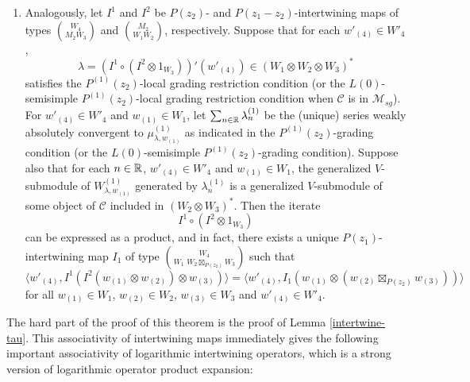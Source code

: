 \documentclass[12pt]{article}
\begin{document}
\begin{theo}
\begin{enumerate}
\item Analogously, let $I^1$ and $I^2$ be $P(z_2)$- and
$P(z_{1}-z_{2})$-intertwining maps of types ${W_4}\choose {M_2W_3}$ and
${M_2}\choose {W_1W_2}$, respectively. Suppose that for each
$w'_{(4)} \in W'_{4}$,
\[
\lambda=(I^1\circ (I^2 \otimes 1_{W_3}))'(w'_{(4)}) \in
(W_{1}\otimes W_{2} \otimes W_{3})^{*}
\]
satisfies the $P^{(1)}(z_2)$-local grading restriction condition (or
the $L(0)$-semisimple $P^{(1)}(z_2)$-local grading restriction
condition when $\mathcal{C}$ is in $\mathcal{M}_{sg}$). For
$w'_{(4)}\in W'_{4}$ and $w_{(1)}\in W_{1}$, let $\sum_{n\in
\mathbb{R}}\lambda_{n}^{(1)}$ be the (unique) series weakly absolutely
convergent to $\mu^{(1)}_{\lambda, w_{(1)}}$ as indicated in the
$P^{(1)}(z_2)$-grading condition (or the $L(0)$-semisimple
$P^{(1)}(z_2)$-grading condition).  Suppose also that for each
$n \in \mathbb{R}$, $w'_{(4)} \in W'_4$ and $w_{(1)} \in W_1$, the generalized
$V$-submodule of $W^{(1)}_{\lambda, w_{(1)}}$ generated by
$\lambda_{n}^{(1)}$ is a generalized $V$-submodule of some object of
$\mathcal{C}$ included in $(W_2 \otimes W_3)^*$.  Then 
the iterate
\[
I^1\circ (I^2 \otimes 1_{W_3})
\]
can be expressed as a product, and in fact, there exists a unique
$P(z_1)$-intertwining map $I_{1}$ of type
${W_4\choose W_1\,\,W_2\boxtimes_{P(z_2)} W_3}$ such that
\[
\langle w'_{(4)}, I^1(I^2(w_{(1)}\otimes w_{(2)})\otimes w_{(3)})\rangle
=\langle w'_{(4)}, I_{1}(w_{(1)}\otimes (w_{(2)}\boxtimes_{P(z_2)}w_{(3)}))
\rangle
\]
for all $w_{(1)}\in W_1$, $w_{(2)}\in W_2$, $w_{(3)}\in W_3$ and
$w'_{(4)}\in W'_4$. 

\end{enumerate}
\end{theo}

The hard part of the proof of this theorem is the proof of Lemma 
\ref{intertwine-tau}. This associativity of intertwining maps 
immediately gives the following important associativity of 
logarithmic intertwining operators, which is a strong version of 
logarithmic operator product expansion:
\end{document}
